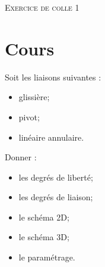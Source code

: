 \documentclass[11pt,oneside]{article}
\begin{document}
\pagestyle{fancy}
\renewcommand{\headrulewidth}{0pt}

\fancyhead{}

\fancyhead[C]{\rule{12cm}{.5pt}}


\renewcommand{\footrulewidth}{0.2pt}

\fancyfoot[C]{\footnotesize{\bfseries \thepage}}


\begin{center}
 \Large\textsc{Exercice de colle 1}
\end{center}

\section{Cours}

\begin{minipage}[c]{.55\linewidth}
Soit les liaisons suivantes :
\begin{itemize}
\item glissière;
\item pivot;
\item linéaire annulaire.
\end{itemize}
\end{minipage}\hfill
\begin{minipage}[c]{.55\linewidth}
Donner :
\begin{itemize}
\item les degrés de liberté;
\item les degrés de liaison; 
\item le schéma 2D;
\item le schéma 3D;
\item le paramétrage.
\end{itemize}
\end{minipage}
\end{document}
